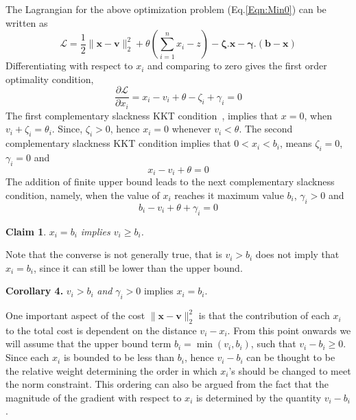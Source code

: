\documentclass{article}
\newcommand{\mathbs}{\boldsymbol}
\newtheorem{claim}{Claim}
\begin{document}
The Lagrangian for the above optimization problem (Eq.\eqref{Eqn:Min0}) can be written as
\begin{equation}\label{Eqn:Lagrangian}
    \mathcal{L}= \frac{1}{2}\|\mathbf{x-v}\|_2^2 + \theta\left( \sum_{i=1}^n x_i - z \right) - \mathbs{\zeta}.\mathbf{x} - \mathbs{\gamma}.(\mathbf{b-x})
\end{equation}
Differentiating with respect to $x_i$ and comparing to zero gives the first order
optimality condition,
\begin{equation}\label{Eqn:first_order_opt}
    \frac{\partial \mathcal{L}}{\partial x_i} = x_i - v_i + \theta - \zeta_i + \gamma_i = 0
\end{equation}
The first complementary slackness KKT condition~\cite{Boyd04}, implies that
$x = 0$, when $v_i + \zeta_i = \theta_i$. Since, $\zeta_i > 0$, hence $x_i = 0$ whenever $v_i < \theta$.
The second complementary slackness KKT condition implies that
$0 < x_i < b_i$, means $\zeta_i=0$, $\gamma_i = 0$ and
\begin{equation}\label{Eqn:v_theta_gamma}
    x_i - v_i + \theta = 0
\end{equation}
The addition of finite upper bound leads to the next complementary slackness condition, namely, when the value of $x_i$ reaches it maximum value $b_i$, $\gamma_i > 0$ and
\begin{equation}\label{Eqn:v_theta_gamma_zero}
    b_i - v_i + \theta + \gamma_i = 0
\end{equation}

\begin{claim}\label{Claim:x_b_v}
$x_i = b_i$ implies $v_i \ge b_i$.
\end{claim}



Note that the converse is not generally true, that is $v_i > b_i$ does not imply that $x_i = b_i$, since it can still be lower than the upper bound.

\textbf{Corollary 4.}\label{Cor:x_eq_b} $v_i > b_i$ \textit{and} $\gamma_i > 0$ implies $x_i = b_i$.

One important aspect of the cost $\|\mathbf{x-v}\|_2^2$ is that the contribution of each $x_i$ to the total cost is dependent on the distance $v_i-x_i$. From this point onwards we will assume that the upper bound term $b_i = \min(v_i, b_i)$, such that $v_i - b_i \ge 0$. Since each $x_i$ is bounded to be less than $b_i$, hence $v_i-b_i$ can be thought to be the relative weight determining the order in which $x_i$'s should be changed to meet the norm constraint. This ordering can also be argued from the fact that the magnitude of the gradient with respect to $x_i$ is determined by the quantity $v_i-b_i$.
\end{document}
